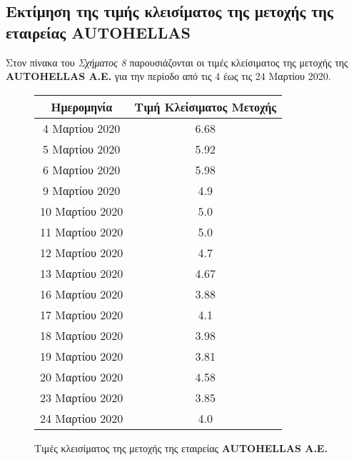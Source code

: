 \documentclass[Second Project.tex]{subfiles}
\begin{document}
\subsection{ Εκτίμηση της τιμής κλεισίματος της μετοχής της εταιρείας \textlatin{\textbf{AUTOHELLAS}}  }
Στον πίνακα του \textit{Σχήματος 8} παρουσιάζονται οι τιμές κλείσιματος της μετοχής της 
\textlatin{\textbf{AUTOHELLAS A.E.}} για την περίοδο από τις 4 έως τις 24 Μαρτίου 2020.
\begin{figure}[h!]
    \centering
    \captionsetup{justification=centering}
    \begin{center}
        \begin{tabular}{ |c|c| } 
        \hline
        Ημερομηνία & Τιμή Κλείσιματος Μετοχής \\ \hline
        4 Μαρτίου 2020 & 6.68 \\ \hline
        5 Μαρτίου 2020 & 5.92 \\ \hline
        6 Μαρτίου 2020 & 5.98 \\  \hline
        9 Μαρτίου 2020 & 4.9 \\ \hline
        10 Μαρτίου 2020 & 5.0 \\  \hline
        11 Μαρτίου 2020 & 5.0 \\ \hline
        12 Μαρτίου 2020 & 4.7 \\ \hline
        13 Μαρτίου 2020 & 4.67 \\ \hline
        16 Μαρτίου 2020 & 3.88 \\ \hline
        17 Μαρτίου 2020 & 4.1 \\ \hline
        18 Μαρτίου 2020 & 3.98 \\ \hline
        19 Μαρτίου 2020 & 3.81 \\ \hline
        20 Μαρτίου 2020 & 4.58 \\ \hline
        23 Μαρτίου 2020 & 3.85 \\ \hline
        24 Μαρτίου 2020 & 4.0 \\ \hline
        \hline
        \end{tabular}
        \caption{Τιμές κλεισίματος της μετοχής της εταιρείας \textlatin{\textbf{AUTOHELLAS A.E.}}}
    \end{center}
\end{figure}
\end{document}
